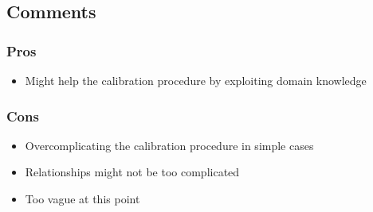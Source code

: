 \subsection{Comments}

\subsubsection*{Pros}
\begin{itemize}
	\item Might help the calibration procedure by exploiting domain knowledge
\end{itemize}

\subsubsection*{Cons}
\begin{itemize}
	\item Overcomplicating the calibration procedure in simple cases
	\item Relationships might not be too complicated
	\item Too vague at this point
\end{itemize}